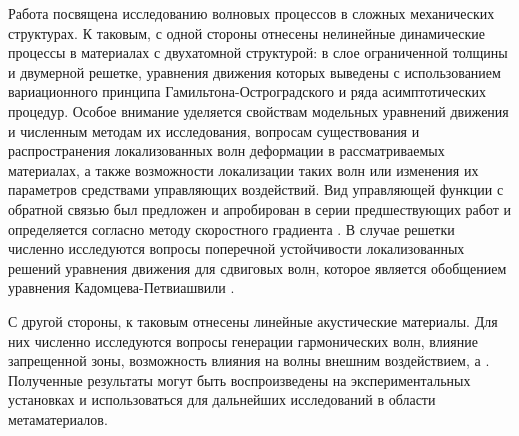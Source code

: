 

Работа посвящена исследованию волновых процессов в сложных механических структурах. К таковым, с одной стороны отнесены нелинейные динамические процессы в материалах с двухатомной структурой: в слое ограниченной толщины и двумерной решетке, уравнения движения которых выведены с использованием вариационного принципа Гамильтона-Остроградского и ряда асимптотических процедур. Особое внимание уделяется свойствам модельных уравнений движения и численным методам их исследования, вопросам существования и распространения локализованных волн деформации в рассматриваемых материалах, а также возможности локализации таких волн или изменения их параметров средствами управляющих воздействий. Вид управляющей функции с обратной связью был предложен и апробирован в серии предшествующих работ \cite{porant16,porant17,PorubovAntonov2018mechSystem} и определяется согласно методу скоростного градиента \cite{fradkov_rus_speed_grad}. В случае решетки численно исследуются вопросы поперечной устойчивости локализованных решений уравнения движения для сдвиговых волн, которое является обобщением уравнения Кадомцева-Петвиашвили \cite{kadpet}.

С другой стороны, к таковым отнесены линейные акустические материалы. Для них численно исследуются вопросы генерации гармонических волн, влияние запрещенной зоны, возможность влияния на волны внешним воздействием, а . Полученные результаты могут быть воспроизведены на экспериментальных установках и использоваться для дальнейших исследований в области метаматериалов.

